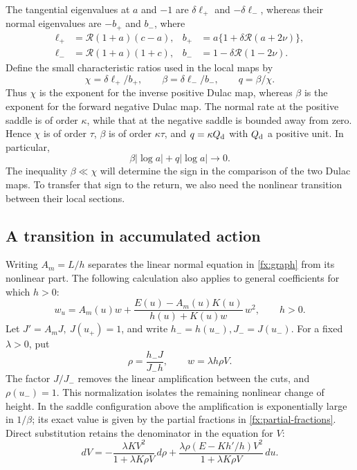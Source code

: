 The tangential eigenvalues at \(a\) and \(-1\) are
\(\delta\ell_+\) and \(-\delta\ell_-\), whereas their normal
eigenvalues are \(-b_+\) and \(b_-\), where
\[
\begin{aligned}
 \ell_+&=\mathcal R(1+a)(c-a),&
 b_+&=a\{1+\delta\mathcal R(a+2\nu)\},\\
 \ell_-&=\mathcal R(1+a)(1+c),&
 b_-&=1-\delta\mathcal R(1-2\nu).
\end{aligned}
\]
Define the small characteristic ratios used in the local maps by
\begin{equation}\label{fx:exponents}
 \chi=\delta\ell_+/b_+,\qquad
 \beta=\delta\ell_-/b_-,\qquad q=\beta/\chi .
\end{equation}
Thus \(\chi\) is the exponent for the inverse positive Dulac map,
whereas \(\beta\) is the exponent for the forward negative Dulac map.
The normal rate at the positive saddle is of order \(\kappa\),
while that at the negative saddle is bounded away from zero. Hence
\(\chi\) is of order \(\tau\), \(\beta\) is of order
\(\kappa\tau\), and \(q=\kappa Q_{\rm d}\) with
\(Q_{\rm d}\) a positive unit. In particular,
\begin{equation}\label{fx:log-smallness}
 \beta|\log a|+q|\log a|\longrightarrow0.
\end{equation}
The inequality \(\beta\ll\chi\) will determine the sign in the
comparison of the two Dulac maps. To transfer that sign to the return,
we also need the nonlinear transition between their local sections.

\subsection{A transition in accumulated action}

Writing \(A_m=L/h\) separates the linear normal equation in
\eqref{fx:graph} from its nonlinear part. The following calculation
also applies to general coefficients for which \(h>0\):
\begin{equation}\label{eq:comparison-middle}
 w_u=A_m(u)w+\frac{E(u)-A_m(u)K(u)}{h(u)+K(u)w}\,w^2,\qquad h>0 .
\end{equation}
Let \(J'=A_mJ,\ J(u_+)=1\), and write \(h_-=h(u_-),J_-=J(u_-)\).
For a fixed \(\lambda>0\), put
\[
 \rho=\frac{h_-J}{J_-h},\qquad
 w=\lambda h\rho V .
\]
The factor \(J/J_-\) removes the linear amplification between the
cuts, and \(\rho(u_-)=1\). This normalization isolates the remaining
nonlinear change of height. In the saddle configuration above the
amplification is exponentially large in \(1/\beta\); its exact value
is given by the partial fractions in \eqref{fx:partial-fractions}.
Direct substitution retains the denominator in the equation for \(V\):
\begin{equation}\label{eq:comparison-action}
 dV=-\frac{\lambda KV^2}{1+\lambda K\rho V}\,d\rho
 +\frac{\lambda\rho(E-Kh'/h)V^2}{1+\lambda K\rho V}\,du .
\end{equation}

